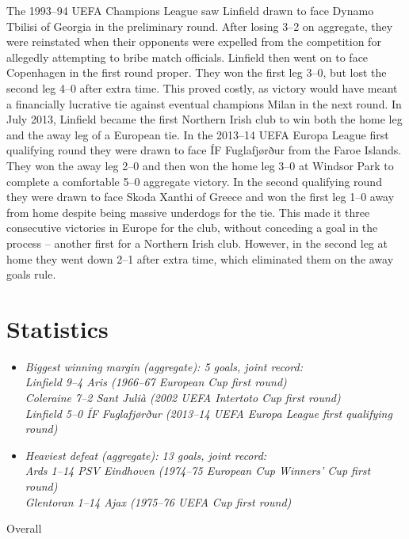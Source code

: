 The 1993--94 UEFA Champions League saw Linfield drawn to face Dynamo
Tbilisi of Georgia in the preliminary round. After losing 3--2 on
aggregate, they were reinstated when their opponents were expelled from
the competition for allegedly attempting to bribe match officials.
Linfield then went on to face Copenhagen in the first round proper. They
won the first leg 3--0, but lost the second leg 4--0 after extra time.
This proved costly, as victory would have meant a financially lucrative
tie against eventual champions Milan in the next round. In July 2013,
Linfield became the first Northern Irish club to win both the home leg
and the away leg of a European tie. In the 2013--14 UEFA Europa League
first qualifying round they were drawn to face ÍF Fuglafjørður from the
Faroe Islands. They won the away leg 2--0 and then won the home leg 3--0
at Windsor Park to complete a comfortable 5--0 aggregate victory. In the
second qualifying round they were drawn to face Skoda Xanthi of Greece
and won the first leg 1--0 away from home despite being massive
underdogs for the tie. This made it three consecutive victories in
Europe for the club, without conceding a goal in the process -- another
first for a Northern Irish club. However, in the second leg at home they
went down 2--1 after extra time, which eliminated them on the away goals
rule.

\section{Statistics}\label{statistics}

\begin{itemize}
\item
  \emph{Biggest winning margin (aggregate): 5 goals, joint record:\\
  Linfield 9--4 Aris (1966--67 European Cup first round)\\
  Coleraine 7--2 Sant Julià (2002 UEFA Intertoto Cup first round)\\
  Linfield 5--0 ÍF Fuglafjørður (2013--14 UEFA Europa League first
  qualifying round)}
\item
  \emph{Heaviest defeat (aggregate): 13 goals, joint record:\\
  Ards 1--14 PSV Eindhoven (1974--75 European Cup Winners' Cup first
  round)\\
  Glentoran 1--14 Ajax (1975--76 UEFA Cup first round)}
\end{itemize}

Overall

